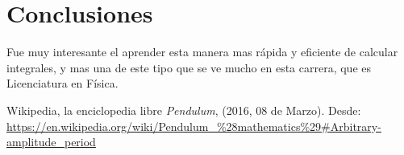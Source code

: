 \documentclass[12pt,letterpaper]{article}
\begin{document}
\section*{Conclusiones}
Fue muy interesante el aprender esta manera mas rápida y eficiente de calcular integrales, y mas una de este tipo que se ve mucho en esta carrera, que es Licenciatura en Física.


\begin{thebibliography}{widestlabel}

 Wikipedia, la enciclopedia libre \emph{Pendulum}, (2016, 08 de Marzo). Desde: \url{https://en.wikipedia.org/wiki/Pendulum_\%28mathematics\%29#Arbitrary-amplitude_period}

\end{thebibliography}
\end{document}
